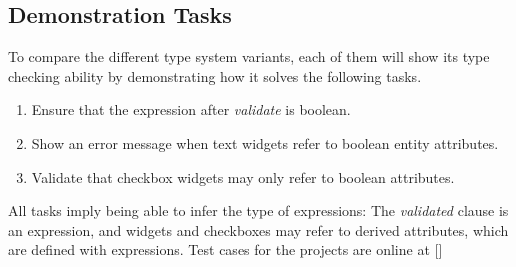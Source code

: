 

\subsection{Demonstration Tasks}
To compare the different type system variants, each of them will show its type checking ability by demonstrating how it solves the following tasks.
\begin{enumerate}
\item Ensure that the expression after \emph{validate} is boolean.
\item Show an error message when text widgets refer to boolean entity attributes.
\item Validate that checkbox widgets may only refer to boolean attributes.
\end{enumerate}

All tasks imply being able to infer the type of expressions: The \emph{validated} clause is an expression, and widgets and checkboxes may refer to derived attributes, which are defined with expressions. Test cases for the projects are online at []%